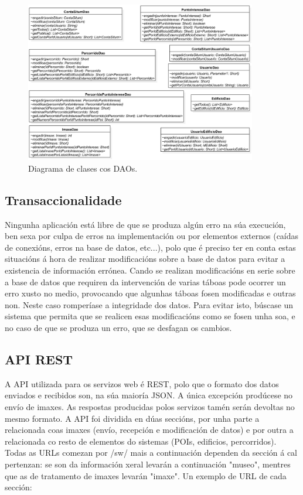 \begin{figure}[tbh] 
	\begin{center}
		\includegraphics[width=0.90\textwidth]{figures/BD/daos}
		\caption{Diagrama de clases cos DAOs.}
		\label{fig:daos}
	\end{center}
\end{figure}


\subsection{Transaccionalidade}
Ningunha aplicación está libre de que se produza algún erro na súa execución, ben sexa por culpa de erros na implementación ou por elementos externos (caídas de conexións, erros na base de datos, etc...), polo que é preciso ter en conta estas situacións á hora de realizar modificacións sobre a base de datos para evitar a existencia de información errónea. Cando se realizan modificacións en serie sobre a base de datos que requiren da intervención de varias táboas pode ocorrer un erro xusto no medio, provocando que algunhas táboas fosen modificadas e outras non. Neste caso romperíase a integridade dos datos. Para evitar isto, búscase un sistema que permita que se realicen esas modificacións como se fosen unha soa, e no caso de que se produza un erro, que se desfagan os cambios.


\subsection{API REST}
A API utilizada para os servizos web é REST, polo que o formato dos datos enviados e recibidos son, na súa maioría JSON. A única excepción prodúcese no envío de imaxes. As respostas producidas polos servizos tamén serán devoltas no mesmo formato.
A API foi dividida en dúas seccións, por unha parte a relacionada coas imaxes (envío, recepción e modificación de datos) e por outra a relacionada co resto de elementos do sistemas (POIs, edificios, percorridos).
Todas as URLs comezan por /sw/ mais a continuación dependen da sección á cal pertenzan: se son da información xeral levarán a continuación "museo", mentres que as de tratamento de imaxes levarán "imaxe". Un exemplo de URL de cada sección:

